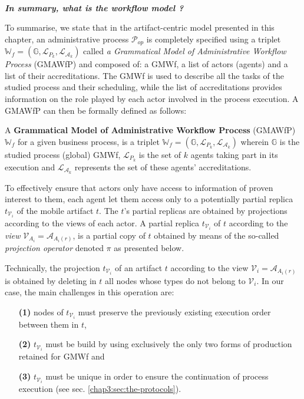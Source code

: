 ~

\noindent\textbf{\textit{In summary, what is the workflow model ?}}

To summarise, we state that in the artifact-centric model presented in this chapter, an administrative process $\mathcal{P}_{op}$ is completely specified using a triplet $\mathbb{W}_f=\left(\mathbb{G}, \mathcal{L}_{P_k}, \mathcal{L}_{\mathcal{A}_k} \right)$ called \textit{a Grammatical Model of Administrative Workflow Process} (GMAWfP) and composed of: a GMWf, a list of actors (agents) and a list of their accreditations. 
The GMWf is used to describe all the tasks of the studied process and their scheduling, while the list of accreditations provides information on the role played by each actor involved in the process execution.  
A GMAWfP can then be formally defined as follows:
\begin{definition}
	\label{defMGSPWfA}
	A \textbf{Grammatical Model of Administrative Workflow Process} (GMAWfP) $\mathbb{W}_f$ for a given business process, is a triplet $\mathbb{W}_f=\left(\mathbb{G}, \mathcal{L}_{P_k}, \mathcal{L}_{\mathcal{A}_k} \right)$
	wherein $\mathbb{G}$ is the studied process (global) GMWf, $\mathcal{L}_{P_k}$ is the set of $k$ agents taking part in its execution and $\mathcal{L}_{\mathcal{A}_k}$ represents the set of these agents' accreditations. 
\end{definition}


\label{chap3:sec:partial-replica}

To effectively ensure that actors only have access to information of proven interest to them, each agent let them access only to a potentially partial replica $t_{\mathcal{V}_i}$ of the mobile artifact $t$. 
The $t$'s partial replicas are obtained by projections according to the views of each actor. 
A partial replica $t_{\mathcal{V}_i}$ of $t$ according to the \textit{view} $\mathcal{V}_{A_i} =  \mathcal{A}_{A_i(r)} $, is a partial copy of $t$ obtained by means of the so-called \textit{projection operator} denoted $\pi$ as presented below. 

Technically, the projection $t_{\mathcal{V}_i}$ of an artifact $t$ according to the view $\mathcal{V}_{i} = \mathcal{A}_{A_i(r)}$ is obtained by deleting in $t$ all nodes whose types do not belong to $\mathcal{V}_{i}$. In our case, the main challenges in this operation are:
\begin{enumerate}
	\item[\textbf{(1)}] nodes of $t_{\mathcal{V}_i}$ must preserve the previously existing execution order between them in $t$,
	\item[\textbf{(2)}] $t_{\mathcal{V}_i}$ must be build by using exclusively the only two forms of production retained for GMWf and
	\item[\textbf{(3)}] $t_{\mathcal{V}_i}$ must be unique in order to ensure the continuation of process execution (see sec. \ref{chap3:sec:the-protocols}).
\end{enumerate}

